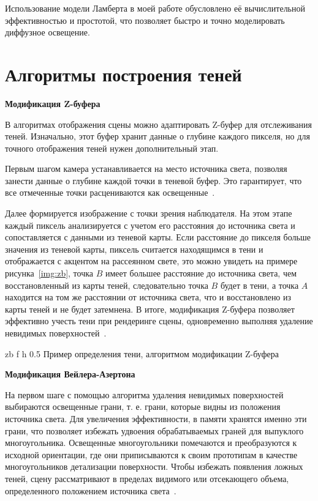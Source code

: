 Использование модели Ламберта в моей работе обусловлено её вычислительной эффективностью и простотой, что позволяет быстро и точно моделировать диффузное освещение.
\fi

\section{Алгоритмы построения теней}
\textbf{Модификация Z-буфера}\

В алгоритмах отображения сцены можно адаптировать Z-буфер для отслеживания теней.
Изначально, этот буфер хранит данные о глубине каждого пикселя, но для точного отображения теней нужен дополнительный этап.

Первым шагом камера устанавливается на место источника света, позволяя занести данные о глубине каждой точки в теневой буфер. Это гарантирует, что все отмеченные точки расцениваются как освещенные~\cite{letion}.

Далее формируется изображение с точки зрения наблюдателя. На этом этапе каждый пиксель анализируется с учетом его расстояния до источника света и сопоставляется с данными из теневой карты. Если расстояние до пикселя больше значения из теневой карты, пиксель считается находящимся в тени и отображается с акцентом на рассеянном свете, это можно увидеть на примере рисунка~\ref{img:zb}, точка $ B $ имеет большее расстояние до источника света, чем восстановленный из карты теней, следовательно точка $ B $ будет в тени, а точка $ A $  находится на том же расстоянии от источника света, что и восстановлено из карты теней и не будет затемнена. В итоге, модификация Z-буфера позволяет эффективно учесть тени при рендеринге сцены, одновременно выполняя удаление невидимых поверхностей~\cite{letion}.

	{zb} %
	{f} %
	{h} %
	{0.5\textwidth} %
	{Пример определения тени, алгоритмом модификации Z-буфера} %

\textbf{Модификация Вейлера-Азертона}

На первом шаге с помощью алгоритма удаления невидимых поверхностей выбираются освещенные грани, т. е. грани, которые видны из положения источника света.
Для увеличения эффективности, в памяти хранятся именно эти грани, что позволяет избежать удвоения обрабатываемых граней для выпуклого многоугольника.
Освещенные многоугольники помечаются и преобразуются к исходной ориентации, где они приписываются к своим прототипам в качестве многоугольников детализации поверхности.
Чтобы избежать появления ложных теней, сцену рассматривают в пределах видимого или отсекающего объема, определенного положением источника света~\cite{letion}.

